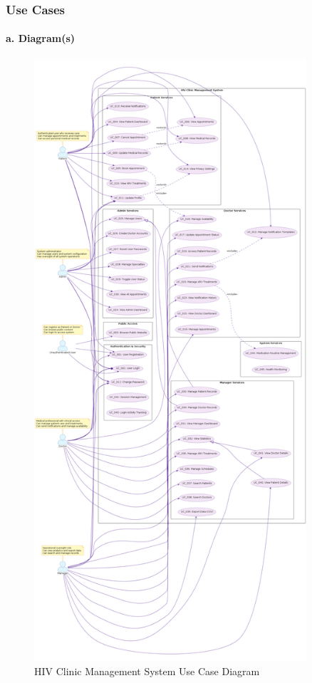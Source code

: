 \documentclass[12pt,a4paper]{article}
\begin{document}
\subsubsection{Use Cases}

\paragraph{a. Diagram(s)}
\begin{figure}[H]
\centering
\includegraphics[width=0.9\textwidth]{diagrams/use_case_diagram.png}
\caption{HIV Clinic Management System Use Case Diagram}
\label{fig:use-case-diagram}
\end{figure}
\end{document}
